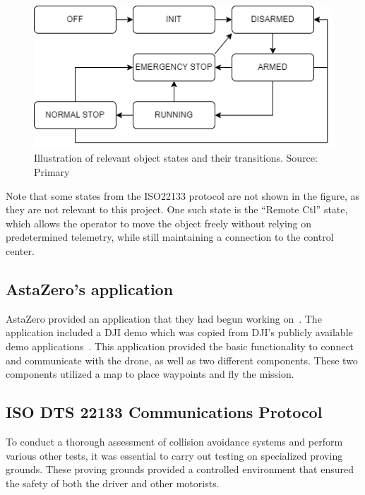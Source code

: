 \begin{figure}[h!]
  \centering
  \includegraphics[scale=0.6]{figure/ISO-states.png}
  \caption{Illustration of relevant object states and their transitions. Source: Primary}
  \label{fig:iso_states}
\end{figure}
Note that some states from the ISO22133 protocol are not shown in the figure, as they are not relevant to this project. One such state is the ``Remote Ctl'' state, which allows the operator to move the object freely without relying on predetermined telemetry, while still maintaining a connection to the control center.

\subsection{AstaZero's application} \label{AZ's app}
AstaZero provided an application that they had begun working on~\cite{azGithubMobil}. The application included a DJI demo which was copied from DJI's publicly available demo applications~\cite{githubmobilesdk}. This application provided the basic functionality to connect and communicate with the drone, as well as two different components. These two components utilized a map to place waypoints and fly the mission.
\subsection{ISO DTS 22133 Communications Protocol} \label{ISO}
To conduct a thorough assessment of collision avoidance systems and perform various other tests, it was essential to carry out testing on specialized proving grounds. These proving grounds provided a controlled environment that ensured the safety of both the driver and other motorists.
\\

